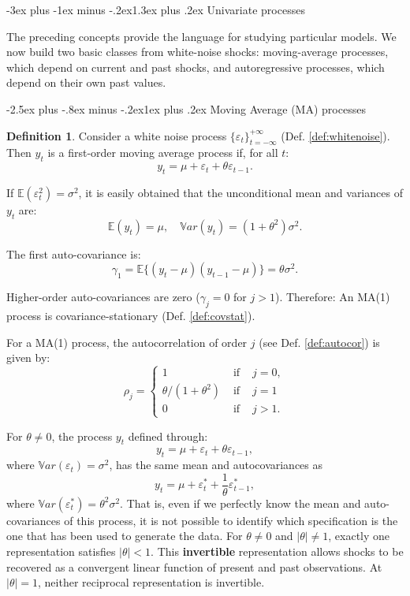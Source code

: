 \documentclass[
  11pt,
]{book}
\makeatletter
\renewcommand\section{\@startsection{section}{1}{\z@}
  {-3ex plus -1ex minus -.2ex}{1.3ex plus .2ex}
  {\normalfont\Large\bfseries\color{TextbookInk}}}
\renewcommand\subsection{\@startsection{subsection}{2}{\z@}
  {-2.5ex plus -.8ex minus -.2ex}{1ex plus .2ex}
  {\normalfont\large\bfseries\color{TextbookInk}}}
\theoremstyle{definition}
\newtheorem{definition}{Definition}[chapter]
\theoremstyle{definition}
\theoremstyle{definition}
\theoremstyle{definition}
\theoremstyle{remark}
\makeatother
\begin{document}
\section{Univariate processes}\label{univariate-processes}

The preceding concepts provide the language for studying particular models. We now build two basic classes from white-noise shocks: moving-average processes, which depend on current and past shocks, and autoregressive processes, which depend on their own past values.

\subsection{Moving Average (MA) processes}\label{moving-average-ma-processes}

\begin{definition}
Consider a white noise process \(\{\varepsilon_t\}_{t = -\infty}^{+\infty}\) (Def. \ref{def:whitenoise}). Then \(y_t\) is a first-order moving average process if, for all \(t\):
\[
y_t = \mu + \varepsilon_t + \theta \varepsilon_{t-1}.
\]
\end{definition}

If \(\mathbb{E}(\varepsilon_t^2)=\sigma^2\), it is easily obtained that the unconditional mean and variances of \(y_t\) are:
\[
\mathbb{E}(y_t) = \mu, \quad \mathbb{V}ar(y_t) = (1+\theta^2)\sigma^2.
\]

The first auto-covariance is:
\[
\gamma_1=\mathbb{E}\{(y_t - \mu)(y_{t-1} - \mu)\} = \theta \sigma^2.
\]

Higher-order auto-covariances are zero (\(\gamma_j=0\) for \(j>1\)). Therefore: An MA(1) process is covariance-stationary (Def. \ref{def:covstat}).

For a MA(1) process, the autocorrelation of order \(j\) (see Def. \ref{def:autocor}) is given by:
\[
\rho_j =
\left\{
\begin{array}{lll}
1 &\mbox{ if }& j=0,\\
\theta / (1 + \theta^2) &\mbox{ if }& j = 1\\
0 &\mbox{ if }& j>1.
\end{array}
\right.
\]

For \(\theta\ne0\), the process \(y_t\) defined through:
\[
y_t = \mu + \varepsilon_t +\theta \varepsilon_{t-1}, 
\]
where \(\mathbb{V}ar(\varepsilon_t)=\sigma^2\), has the same mean and autocovariances as
\[
y_t = \mu + \varepsilon^*_t +\frac{1}{\theta}\varepsilon^*_{t-1},
\]
where \(\mathbb{V}ar(\varepsilon^*_t)=\theta^2\sigma^2\). That is, even if we perfectly know the mean and auto-covariances of this process, it is not possible to identify which specification is the one that has been used to generate the data. For \(\theta\ne0\) and \(|\theta|\ne1\), exactly one representation satisfies \(|\theta|<1\). This \textbf{invertible} representation allows shocks to be recovered as a convergent linear function of present and past observations. At \(|\theta|=1\), neither reciprocal representation is invertible.
\end{document}
